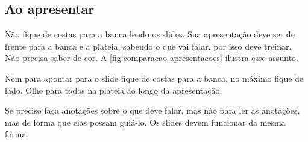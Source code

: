 \documentclass[a4paper,12pt]{article}
\begin{document}
\subsection{Ao apresentar}

Não fique de costas para a banca lendo os slides. Sua apresentação deve ser de frente para a banca e a plateia, sabendo o que vai falar, por isso deve treinar. Não precisa saber de cor. A \autoref{fig:comparacao-apresentacoes} ilustra esse assunto. 

Nem para apontar para o slide fique de costas para a banca, no máximo fique de lado. Olhe para todos na plateia ao longo da apresentação.

Se preciso faça anotações sobre o que deve falar, mas não para ler as anotações, mas de forma que elas possam guiá-lo. Os slides devem funcionar da mesma forma.
\end{document}
